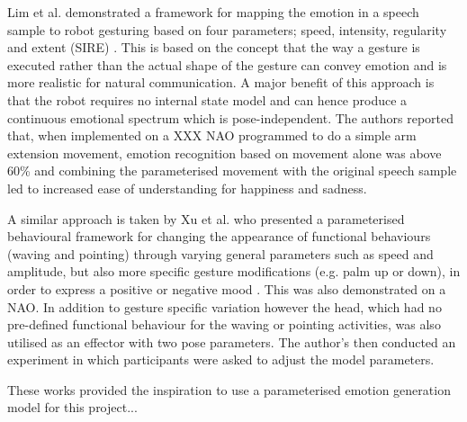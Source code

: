\documentclass[11pt]{article}
\begin{document}
Lim et al. demonstrated a framework for mapping the emotion in a speech sample to robot gesturing based on four parameters;  speed, intensity, regularity and extent (SIRE) \cite{lim2011converting}. This is based on the concept that the way a gesture is executed rather than the actual shape of the gesture can convey emotion and is more realistic for natural communication. A major benefit of this approach is that the robot requires no internal state model and can hence produce a continuous emotional spectrum which is pose-independent. The authors reported that, when implemented on a XXX NAO programmed to do a simple arm extension movement, emotion recognition based on movement alone was above 60\% and combining the parameterised movement with the original speech sample led to increased ease of understanding for happiness and sadness.   

A similar approach is taken by Xu et al. who presented a parameterised behavioural framework for changing the appearance of functional behaviours (waving and pointing) through varying general parameters such as speed and amplitude, but also more specific gesture modifications (e.g. palm up or down), in order to express a positive or negative mood \cite{xu2013mood}. This was also demonstrated on a NAO. In addition to gesture specific variation however the head, which had no pre-defined functional behaviour for the waving or pointing activities, was also utilised as an effector with two pose parameters. The author's then conducted an experiment in which participants were asked to adjust the model parameters. 

These works provided the inspiration to use a parameterised emotion generation model for this project...
\end{document}
